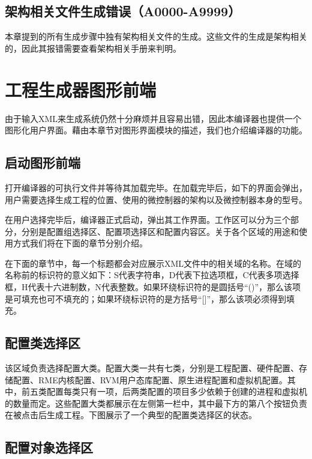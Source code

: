 \subsection{架构相关文件生成错误（A0000-A9999）}\label{subsec:5-6-12}

本章提到的所有生成步骤中独有架构相关文件的生成。这些文件的生成是架构相关的，因此其报错需要查看架构相关手册来判明。


\section{工程生成器图形前端}\label{sec:5-7}

由于输入XML来生成系统仍然十分麻烦并且容易出错，因此本编译器也提供一个图形化用户界面。藉由本章节对图形界面模块的描述，我们也介绍编译器的功能。

\subsection{启动图形前端}\label{subsec:5-7-1}

打开编译器的可执行文件并等待其加载完毕。在加载完毕后，如下的界面会弹出，用户需要选择生成工程的位置、使用的微控制器的架构以及微控制器本身的型号。

在用户选择完毕后，编译器正式启动，弹出其工作界面。工作区可以分为三个部分，分别是配置组选择区、配置项选择区和配置内容区。关于各个区域的用途和使用方式我们将在下面的章节分别介绍。

在下面的章节中，每一个标题都会对应展示XML文件中的相关域的名称。在域的名称前的标识符的意义如下：S代表字符串，D代表下拉选项框，C代表多项选择框，H代表十六进制数，N代表整数。如果环绕标识符的是圆括号``()''，那么该项是可填充也可不填充的；如果环绕标识符的是方括号``{[}{]}''，那么该项必须得到填充。

\subsection{配置类选择区}\label{subsec:5-7-2}

该区域负责选择配置大类。配置大类一共有七类，分别是工程配置、硬件配置、存储配置、RME内核配置、RVM用户态库配置、原生进程配置和虚拟机配置。其中，前五类配置每类只有一项，后两类配置的项目多少依赖于创建的进程和虚拟机的数量而定。这些配置大类都展示在左侧第一栏中，其中最下方的第八个按钮负责在被点击后生成工程。下图展示了一个典型的配置类选择区的状态。

\subsection{配置对象选择区}\label{subsec:5-7-3}

